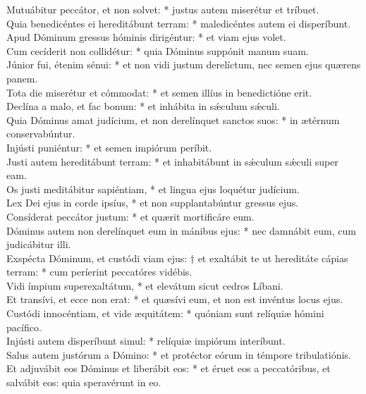 {	Mutuábitur peccátor, et non solvet: * justus autem miserétur et tríbuet. \\
	Quia benedicéntes ei hereditábunt terram: * maledicéntes autem ei disperíbunt. \\
	Apud Dóminum gressus hóminis dirigéntur: * et viam ejus volet. \\
	Cum cecíderit non collidétur: * quia Dóminus suppónit manum suam. \\
	Júnior fui, étenim sénui: * et non vidi justum derelíctum, nec semen ejus quærens panem. \\
	Tota die miserétur et cómmodat: * et semen illíus in benedictióne erit. \\
	Declína a malo, et fac bonum: * et inhábita in sǽculum sǽculi. \\
	Quia Dóminus amat judícium, et non derelínquet sanctos suos: * in ætérnum conservabúntur. \\
	Injústi puniéntur: * et semen impiórum períbit. \\
	Justi autem hereditábunt terram: * et inhabitábunt in sǽculum sǽculi super eam. \\
	Os justi meditábitur sapiéntiam, * et lingua ejus loquétur judícium. \\
	Lex Dei ejus in corde ipsíus, * et non supplantabúntur gressus ejus. \\
	Consíderat peccátor justum: * et quærit mortificáre eum. \\
	Dóminus autem non derelínquet eum in mánibus ejus: * nec damnábit eum, cum judicábitur illi. \\
	Exspécta Dóminum, et custódi viam ejus: † et exaltábit te ut hereditáte cápias terram: * cum períerint peccatóres vidébis. \\
	Vidi ímpium superexaltátum, * et elevátum sicut cedros Líbani. \\
	Et transívi, et ecce non erat: * et quæsívi eum, et non est invéntus locus ejus. \\
	Custódi innocéntiam, et vide æquitátem: * quóniam sunt relíquiæ hómini pacífico. \\
	Injústi autem disperíbunt simul: * relíquiæ impiórum interíbunt. \\
	Salus autem justórum a Dómino: * et protéctor eórum in témpore tribulatiónis. \\
	Et adjuvábit eos Dóminus et liberábit eos: * et éruet eos a peccatóribus, et salvábit eos: quia speravérunt in eo. \\
}

